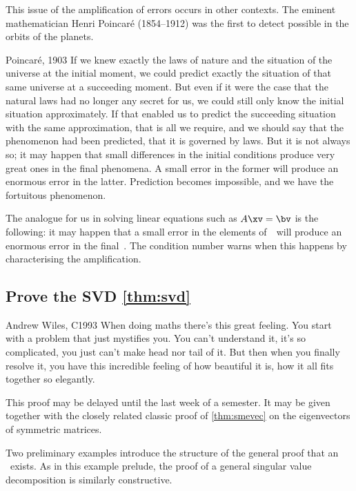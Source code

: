 This issue of the amplification of errors occurs in other contexts.
The eminent mathematician  Henri Poincar\'e (1854--1912) was the first to detect possible  in the orbits of the planets.
\begin{quoted}{Poincar\'e, 1903}
If we knew exactly the laws of nature and the situation of the universe at the initial moment, we could predict exactly the situation of that same universe at a succeeding moment.
But even if it were the case that the natural laws had no longer any secret for us, we could still only know the initial situation approximately. 
If that enabled us to predict the succeeding situation with the same approximation, that is all we require, and we should say that the phenomenon had been predicted, that it is governed by laws. 
But it is not always so; it may happen that small differences in the initial conditions produce very great ones in the final phenomena. 
A small error in the former will produce an enormous error in the latter. 
Prediction becomes impossible, and we have the fortuitous phenomenon.
\end{quoted}
The analogue for us in solving linear equations such as \(A\xv=\bv\) is the following: it may happen that a small error in the elements of~\bv\ will produce an enormous error in the final~\xv.
The condition number warns when this happens by characterising the amplification. 







\subsection{Prove the SVD \autoref{thm:svd}}
\label{sec:psvdt}


\begin{quoted}{Andrew Wiles, C1993}
When doing maths there's this great feeling.
You start with a problem that just mystifies you.
You can't understand it, it's so complicated, you just can't make head nor tail of it.
But then when you finally resolve it, you have this incredible feeling of how beautiful it is, how it all fits together so elegantly.
\end{quoted}


\begin{aside}
This proof may be delayed until the last week of a semester.
It may be given together with the closely related classic proof of \autoref{thm:smevec} on the eigenvectors of symmetric matrices.  
\end{aside}
Two preliminary examples introduce the structure of the general proof that an \svd\ exists.  
As in this example prelude, the proof of a general singular value decomposition is similarly constructive.

